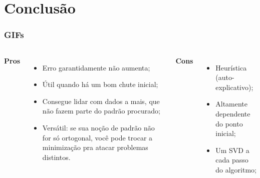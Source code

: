 \section{Conclusão}
\begin{frame}[fragile]
  \frametitle{GIFs}

\end{frame}

\begin{frame}
  \begin{columns}
    \textbf{Pros}
    \begin{itemize}
      \item Erro garantidamente não aumenta;
      \item Útil quando há um bom chute inicial;
      \item Consegue lidar com dados a mais, que não fazem parte do padrão procurado;
      \item Versátil: se sua noção de padrão não for só ortogonal, você pode trocar a minimização pra atacar problemas distintos.
    \end{itemize}
    \textbf{Cons}
    \begin{itemize}
      \item Heurística (auto-explicativo);
      \item Altamente dependente do ponto inicial;
      \item Um SVD a cada passo do algoritmo;
    \end{itemize}
  \end{columns}
\end{frame}

